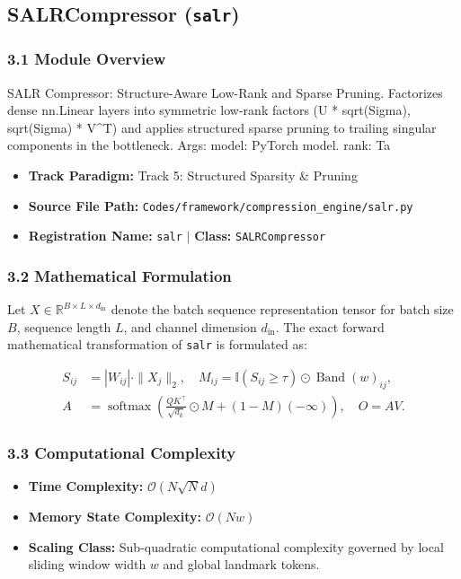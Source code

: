 \subsection{SALRCompressor (\texttt{salr})}
\label{sec:app_module_salr}

\subsubsection*{3.1 Module Overview}
SALR Compressor: Structure-Aware Low-Rank and Sparse Pruning.  Factorizes dense nn.Linear layers into symmetric low-rank factors (U * sqrt(Sigma), sqrt(Sigma) * V^T) and applies structured sparse pruning to trailing singular components in the bottleneck.  Args:     model: PyTorch model.     rank: Ta
\begin{itemize}
    \item \textbf{Track Paradigm:} Track 5: Structured Sparsity & Pruning
    \item \textbf{Source File Path:} \texttt{Codes/framework/compression\_engine/salr.py}
    \item \textbf{Registration Name:} \texttt{salr} $\mid$ \textbf{Class:} \texttt{SALRCompressor}
\end{itemize}

\subsubsection*{3.2 Mathematical Formulation}
Let $X \in \mathbb{R}^{B \times L \times d_{\text{in}}}$ denote the batch sequence representation tensor for batch size $B$, sequence length $L$, and channel dimension $d_{\text{in}}$. The exact forward mathematical transformation of \texttt{salr} is formulated as:

\begin{align}
S_{ij} &= |W_{ij}| \cdot \|X_j\|_2, \quad M_{ij} = \mathbb{I}(S_{ij} \ge \tau) \odot \operatorname{Band}(w)_{ij}, \\
A &= \operatorname{softmax}\left(\frac{Q K^\top}{\sqrt{d_k}} \odot M + (1 - M)(-\infty)\right), \quad O = A V.
\end{align}


\subsubsection*{3.3 Computational Complexity}
\begin{itemize}
    \item \textbf{Time Complexity:} $\mathcal{O}(N \sqrt{N} d)$
    \item \textbf{Memory State Complexity:} $\mathcal{O}(N w)$
    \item \textbf{Scaling Class:} Sub-quadratic computational complexity governed by local sliding window width $w$ and global landmark tokens.
\end{itemize}

